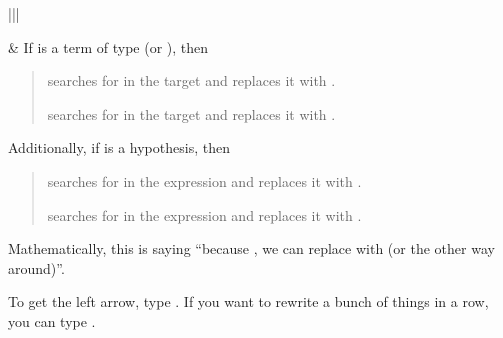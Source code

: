 \documentclass[letterpaper,10pt,english]{sphinxmanual}
\begin{document}
\begin{savenotes}\sphinxattablestart
\centering
\begin{tabular}[t]{|||}
\hline

\sphinxAtStartPar
{}
&
\sphinxAtStartPar
If  is a term of type  (or ), then
\begin{quote}

\sphinxAtStartPar
{} searches for  in the target and replaces it with .

\sphinxAtStartPar
{} searches for  in the target and replaces it with .
\end{quote}

\sphinxAtStartPar
Additionally, if  is a hypothesis, then
\begin{quote}

\sphinxAtStartPar
{} searches for  in the expression  and replaces it with .

\sphinxAtStartPar
{} searches for  in the expression  and replaces it with .
\end{quote}

\sphinxAtStartPar
Mathematically, this is saying “because , we can replace  with  (or the other way around)”.
\\
\hline
\end{tabular}
\par
\sphinxattableend\end{savenotes}

\sphinxAtStartPar
To get the left arrow, type . If you want to rewrite a bunch of things in a row, you can type .
\end{document}
